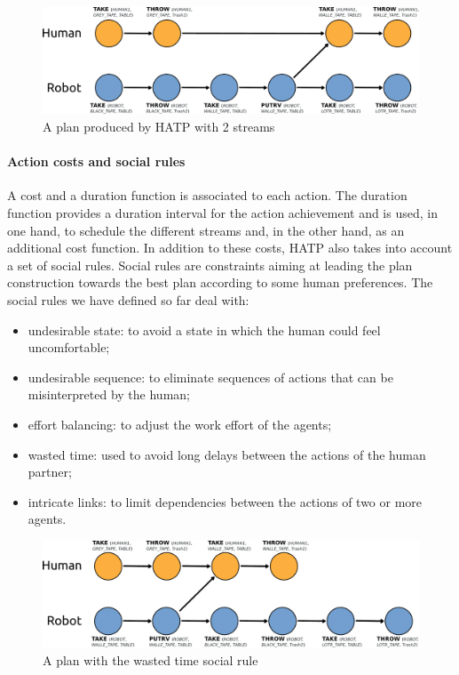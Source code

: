 \documentclass[preprint,5p]{elsarticle}
\begin{document}
\begin{figure}[htbp]
  \centering
  \includegraphics[width=0.95\columnwidth]{./figs/first_plan.pdf}
  \caption{A plan produced by HATP with 2 streams}
  \label{plan_hatp1}
\end{figure}

\paragraph{Action costs and social rules}
A cost and a duration function is associated to each action.
The duration function provides a duration interval for the action
achievement and is used, in one hand, to schedule the different
streams and, in the other hand, as an additional cost function.
In addition to these costs, HATP also takes into account a set of social
rules.  Social rules are constraints aiming at leading the plan
construction towards the best plan according to some human
preferences. The social rules we have defined so far deal with:

\begin{itemize}
\item undesirable state: to avoid a state in which the human could
  feel uncomfortable;
\item undesirable sequence: to eliminate sequences of actions that can
  be misinterpreted by the human;
\item effort balancing: to adjust the work effort of the agents;
\item wasted time: used to avoid long delays between the actions of
  the human partner;
\item intricate links: to limit dependencies between the actions of
  two or more agents.
\end{itemize}

\begin{figure}[htbp]
  \centering
  \includegraphics[width=0.95\columnwidth]{./figs/second_plan.pdf}
  \caption{A plan with the wasted time social rule}
  \label{plan_hatp2}
\end{figure}
\end{document}
